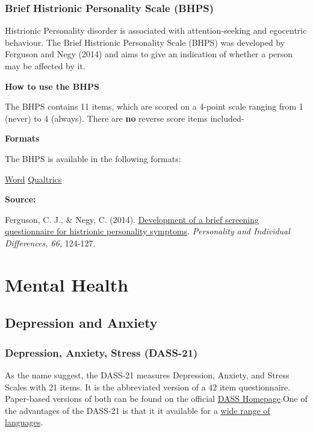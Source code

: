\documentclass[
]{book}
\begin{document}
\hypertarget{brief-histrionic-personality-scale-bhps}{%
\subsection{Brief Histrionic Personality Scale (BHPS)}\label{brief-histrionic-personality-scale-bhps}}

Histrionic Personality disorder is associated with attention-seeking and egocentric behaviour. The Brief Histrionic Personality Scale (BHPS) was developed by Ferguson and Negy (2014) and aims to give an indication of whether a person may be affected by it.

\textbf{How to use the BHPS}

The BHPS contains 11 items, which are scored on a 4-point scale ranging from 1 (never) to 4 (always). There are \textbf{no} reverse score items included-

\textbf{Formats}

The BHPS is available in the following formats:

\href{link\%20to\%20file}{Word} \textbar{} \href{link\%20to\%20file}{Qualtrics}

\textbf{Source:}

Ferguson, C. J., \& Negy, C. (2014). \href{https://www.christopherjferguson.com/Histrionic.pdf}{Development of a brief screening questionnaire for histrionic personality symptoms}. \emph{Personality and Individual Differences, 66,} 124-127.

\hypertarget{mental-health}{%
\chapter{Mental Health}\label{mental-health}}

\hypertarget{depression-and-anxiety}{%
\section{Depression and Anxiety}\label{depression-and-anxiety}}

\hypertarget{depression-anxiety-stress-dass-21}{%
\subsection{Depression, Anxiety, Stress (DASS-21)}\label{depression-anxiety-stress-dass-21}}

As the name suggest, the DASS-21 measures Depression, Anxiety, and Stress Scales with 21 items. It is the abbreviated version of a 42 item questionnaire. Paper-based versions of both can be found on the official \href{http://www2.psy.unsw.edu.au/groups/dass/}{DASS Homepage}.One of the advantages of the DASS-21 is that it it available for a \href{http://www2.psy.unsw.edu.au/groups/dass/translations.htm}{wide range of languages}.
\end{document}
